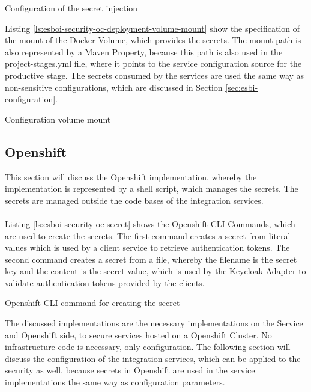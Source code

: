 \begin{listing}
	\caption{Configuration of the secret injection}
	\label{ls:esboi-security-oc-deployment-volume-secret}
\end{listing}

Listing \vref{ls:esboi-security-oc-deployment-volume-mount} show the specification of the mount of the Docker Volume, which provides the secrets. The mount path is also represented by a Maven Property, because this path is also used in the project-stages.yml file, where it points to the service configuration source for the productive stage. The secrets consumed by the services are used the same way as non-sensitive configurations, which are discussed in Section \vref{sec:esbi-configuration}.

\begin{listing}
	\caption{Configuration volume mount}
	\label{ls:esboi-security-oc-deployment-volume-mount}
\end{listing}

\subsection{Openshift}
\label{sec:esbi-security-openshift}
This section will discuss the Openshift implementation, whereby the implementation is represented by a shell script, which manages the secrets. The secrets are managed outside the code bases of the integration services.
\\ \\
Listing \vref{ls:esboi-security-oc-secret} shows the Openshift CLI-Commands, which are used to create the secrets. The first command creates a secret from literal values which is used by a client service to retrieve authentication tokens. The second command creates a secret from a file, whereby the filename is the secret key and the content is the secret value, which is used by the Keycloak Adapter to validate authentication tokens provided by the clients. 

\begin{listing}
	\caption{Openshift CLI command for creating the secret}
	\label{ls:esboi-security-oc-secret}
\end{listing}

The discussed implementations are the necessary implementations on the Service and Openshift side, to secure services hosted on a Openshift Cluster. No infrastructure code is necessary, only configuration. The following section will discuss the configuration of the integration services, which can be applied to the security as well, because secrets in Openshift are used in the service implementations the same way as configuration parameters.


